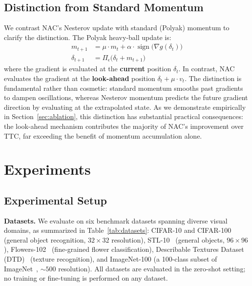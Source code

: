 \documentclass[12pt,a4paper]{article}
\begin{document}
\subsection{Distinction from Standard Momentum}

We contrast NAC's Nesterov update with standard (Polyak) momentum to clarify the distinction. The Polyak heavy-ball update is:
\begin{align}
m_{t+1} &= \mu \cdot m_t + \alpha \cdot \operatorname{sign}\!\big(\nabla g(\delta_t)\big) \label{eq:polyak} \\
\delta_{t+1} &= \Pi_{\epsilon}\!\big(\delta_t + m_{t+1}\big)
\end{align}
where the gradient is evaluated at the \textbf{current} position $\delta_t$. In contrast, NAC evaluates the gradient at the \textbf{look-ahead} position $\delta_t + \mu \cdot v_t$. The distinction is fundamental rather than cosmetic: standard momentum smooths past gradients to dampen oscillations, whereas Nesterov momentum predicts the future gradient direction by evaluating at the extrapolated state. As we demonstrate empirically in Section~\ref{sec:ablation}, this distinction has substantial practical consequences: the look-ahead mechanism contributes the majority of NAC's improvement over TTC, far exceeding the benefit of momentum accumulation alone.

\section{Experiments}\label{sec:experiments}

\subsection{Experimental Setup}

\textbf{Datasets.} We evaluate on six benchmark datasets spanning diverse visual domains, as summarized in Table~\ref{tab:datasets}: CIFAR-10 and CIFAR-100~\cite{krizhevsky2009learning} (general object recognition, $32\times32$ resolution), STL-10~\cite{coates2011analysis} (general objects, $96\times96$), Flowers-102~\cite{nilsback2008automated} (fine-grained flower classification), Describable Textures Dataset (DTD)~\cite{cimpoi2014describing} (texture recognition), and ImageNet-100 (a 100-class subset of ImageNet~\cite{deng2009imagenet}, ${\sim}500$ resolution). All datasets are evaluated in the zero-shot setting; no training or fine-tuning is performed on any dataset.
\end{document}
